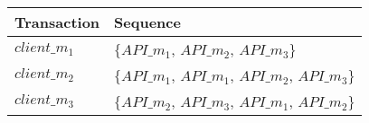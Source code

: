 \begin{tabular}{ll}
\toprule
\textsf{Transaction} & \textsf{Sequence}\\
\midrule
%
\textsf{$client\_m_1$} & \textsf{$\{API\_m_1$, $API\_m_2$, $API\_m_3\}$}\\
%
\textsf{$client\_m_2$} & \textsf{$\{API\_m_1$, $API\_m_1$, $API\_m_2$, $API\_m_3\}$}\\
\textsf{$client\_m_3$} & \textsf{$\{API\_m_2$, $API\_m_3$, $API\_m_1$, $API\_m_2\}$}\\
\bottomrule
\end{tabular}